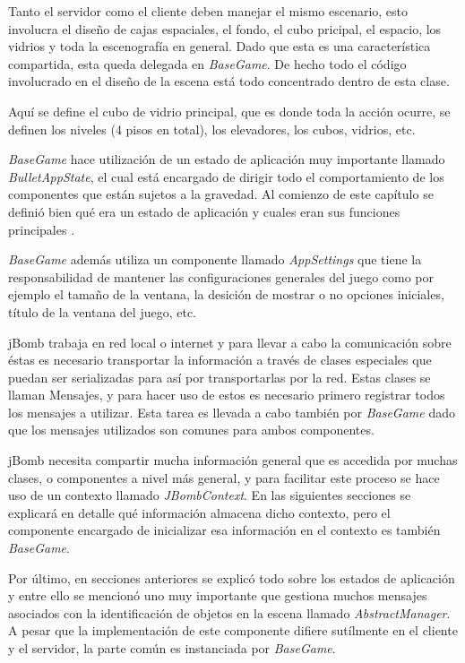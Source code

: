 \documentclass[a4paper,12pt,openany,oneside]{book}
\begin{document}
Tanto el servidor como el cliente deben manejar el mismo escenario, esto involucra el diseño de cajas espaciales, el fondo, el cubo pricipal, el espacio, los vidrios y toda la escenografía en general. Dado que esta es una característica compartida, esta queda delegada en \textit{BaseGame}. De hecho todo el código involucrado en el diseño de la escena está todo concentrado dentro de esta clase.

Aquí se define el cubo de vidrio principal, que es donde toda la acción ocurre, se definen los niveles (4 pisos en total), los elevadores, los cubos, vidrios, etc.

\textit{BaseGame} hace utilización de un estado de aplicación muy importante llamado \textit{BulletAppState}, el cual está encargado de dirigir todo el comportamiento de los componentes que están sujetos a la gravedad. Al comienzo de este capítulo se definió bien qué era un estado de aplicación y cuales eran sus funciones principales \cite{BEGINNERS}.

\textit{BaseGame} además utiliza un componente llamado \textit{AppSettings} que tiene la responsabilidad de mantener las configuraciones generales del juego como por ejemplo el tamaño de la ventana, la desición de mostrar o no opciones iniciales, título de la ventana del juego, etc.

jBomb trabaja en red local o internet y para llevar a cabo la comunicación sobre éstas es necesario transportar la información a través de clases especiales que puedan ser serializadas para así por transportarlas por la red. Estas clases se llaman Mensajes, y para hacer uso de estos es necesario primero registrar todos los mensajes a utilizar. Esta tarea es llevada a cabo también por \textit{BaseGame} dado que los mensajes utilizados son comunes para ambos componentes.

jBomb necesita compartir mucha información general que es accedida por muchas clases, o componentes a nivel más general, y para facilitar este proceso se hace uso de un contexto llamado \textit{JBombContext}. En las siguientes secciones se explicará en detalle qué información almacena dicho contexto, pero el componente encargado de inicializar esa información en el contexto es también \textit{BaseGame}.

Por último, en secciones anteriores se explicó todo sobre los estados de aplicación y entre ello se mencionó uno muy importante que gestiona muchos mensajes asociados con la identificación de objetos en la escena llamado \textit{AbstractManager}. A pesar que la implementación de este componente difiere sutílmente en el cliente y el servidor, la parte común es instanciada por \textit{BaseGame}.
\end{document}
